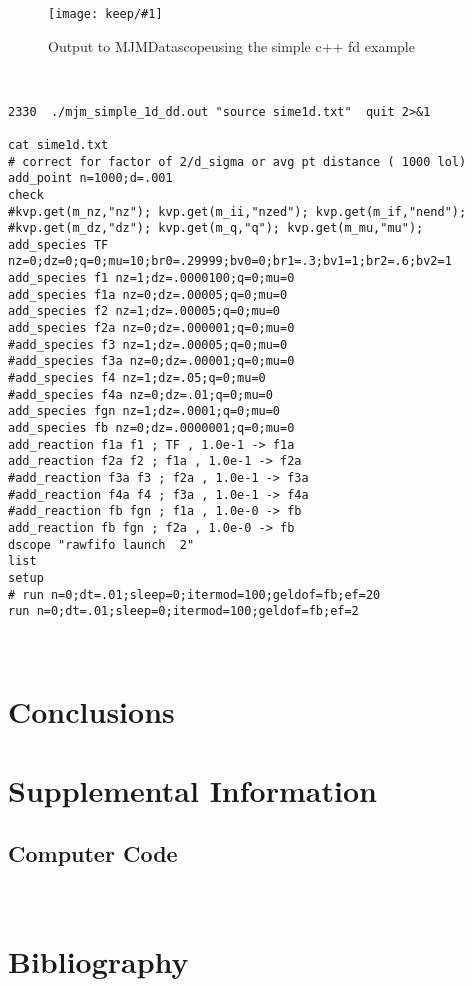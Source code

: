 \documentclass[aps,secnumarabic,balancelastpage,amsmath,amssymb,nofootinbib]{revtex4}
\newcommand{\mjmprod}{MJMDatascope}
\newcommand{\mjmtol}[1]{
 \fbox{  
\begin{minipage}[t]{\textwidth}
{ \centering{\bf{Thinking outloud}} }
\par   
#1 
\end{minipage} 
}
}
\newcommand{\mjmpicture}[3]
{
\begin{figure}[H]
{ \texttt{[image: keep/\#1]} }
\caption{#2}
\label{fig:#3}
\end{figure}
} %
\begin{document}
\mjmpicture{simdscope.jpeg}{Output to \mjmprod using the simple c++ fd  example}{cppdscope}
\begin{lstlisting}


2330  ./mjm_simple_1d_dd.out "source sime1d.txt"  quit 2>&1

cat sime1d.txt 
# correct for factor of 2/d_sigma or avg pt distance ( 1000 lol) 
add_point n=1000;d=.001
check
#kvp.get(m_nz,"nz"); kvp.get(m_ii,"nzed"); kvp.get(m_if,"nend");
#kvp.get(m_dz,"dz"); kvp.get(m_q,"q"); kvp.get(m_mu,"mu");
add_species TF nz=0;dz=0;q=0;mu=10;br0=.29999;bv0=0;br1=.3;bv1=1;br2=.6;bv2=1
add_species f1 nz=1;dz=.0000100;q=0;mu=0
add_species f1a nz=0;dz=.00005;q=0;mu=0
add_species f2 nz=1;dz=.00005;q=0;mu=0
add_species f2a nz=0;dz=.000001;q=0;mu=0
#add_species f3 nz=1;dz=.00005;q=0;mu=0
#add_species f3a nz=0;dz=.00001;q=0;mu=0
#add_species f4 nz=1;dz=.05;q=0;mu=0
#add_species f4a nz=0;dz=.01;q=0;mu=0
add_species fgn nz=1;dz=.0001;q=0;mu=0
add_species fb nz=0;dz=.0000001;q=0;mu=0
add_reaction f1a f1 ; TF , 1.0e-1 -> f1a
add_reaction f2a f2 ; f1a , 1.0e-1 -> f2a
#add_reaction f3a f3 ; f2a , 1.0e-1 -> f3a
#add_reaction f4a f4 ; f3a , 1.0e-1 -> f4a
#add_reaction fb fgn ; f1a , 1.0e-0 -> fb
add_reaction fb fgn ; f2a , 1.0e-0 -> fb
dscope "rawfifo launch  2"
list 
setup
# run n=0;dt=.01;sleep=0;itermod=100;geldof=fb;ef=20
run n=0;dt=.01;sleep=0;itermod=100;geldof=fb;ef=2



\end{lstlisting}



\mjmtol{
}


\section{Conclusions}


\section{Supplemental Information}

\subsection{Computer Code}


\begin{lstlisting}


\end{lstlisting}
\section{Bibliography}
\end{document}
